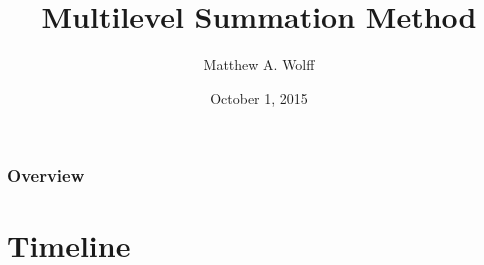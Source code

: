 \documentclass{beamer}
\title[Multilevel Summation Method]{Multilevel Summation Method}
\author{Matthew A. Wolff} %
\institute[Purdue University] %
{
	Purdue University \\ %
	\medskip
	\textit{wolff1@purdue.edu} %
}
\date{October 1, 2015} %
\begin{document}
\begin{frame}
	\titlepage %
\end{frame}

\begin{frame}
	\frametitle{Overview} %
	\tableofcontents %
\end{frame}

\section{Timeline}
\end{document}
